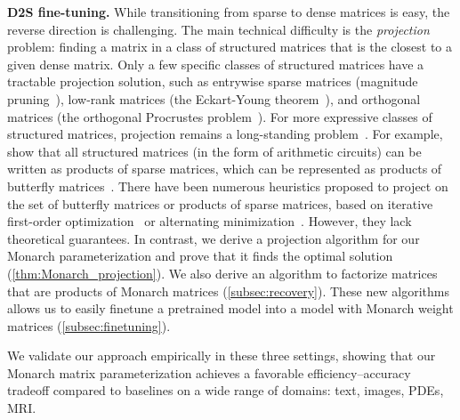 \textbf{D2S fine-tuning.} While transitioning from sparse to dense matrices is easy, the reverse direction is challenging. The main technical difficulty is the \emph{projection} problem: finding a matrix in a class of structured matrices that is the closest to a given dense matrix. Only a few specific classes of structured matrices have a tractable projection solution, such as entrywise sparse matrices (magnitude pruning~\citep{tewarson1973sparse}), low-rank matrices (the Eckart-Young theorem~\citep{eckart1936approximation}), and orthogonal matrices (the orthogonal Procrustes problem~\citep{schonemann1966generalized}). For more expressive classes of structured matrices, projection remains a long-standing problem~\citep{pan2012structured}. For example, \citet{desa2018two} show that all structured matrices (in the form of arithmetic circuits) can be written as products of sparse matrices, which can be represented as products of butterfly matrices~\citep{dao2020kaleidoscope}. There have been numerous heuristics proposed to project on the set of butterfly matrices or products of sparse matrices, based on iterative first-order optimization~\citep{le2016flexible, dao2019learning, khalitov2021sparse} or alternating minimization~\citep{lin2021deformable}. However, they lack theoretical guarantees. In contrast, we derive a projection algorithm for our Monarch parameterization and prove that it finds the optimal solution (\ref{thm:Monarch_projection}).
We also derive an algorithm to factorize matrices that are products of Monarch matrices (\ref{subsec:recovery}). These new algorithms allows us to easily finetune a pretrained model into a model with Monarch weight matrices (\ref{subsec:finetuning}).

We validate our approach empirically in these three settings, showing that our Monarch matrix parameterization achieves a favorable efficiency--accuracy tradeoff compared to baselines on a wide range of domains: text, images, PDEs, MRI.

